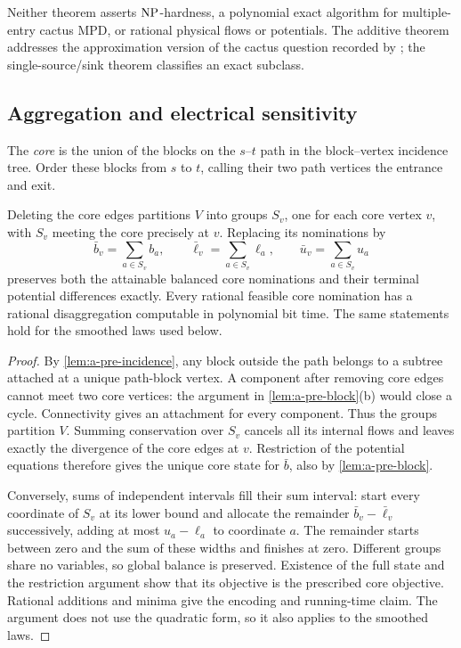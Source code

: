 Neither theorem asserts $\mathrm{NP}$-hardness, a polynomial exact algorithm for
multiple-entry cactus MPD, or rational physical flows or potentials.
The additive theorem
addresses the approximation version of the cactus question recorded by
\citet[pp.~9--10]{pfetsch2026-potential-based-flowsan-overview}; the
single-source/sink theorem classifies an exact subclass.

\subsection{Aggregation and electrical sensitivity}
\label{subsec:a-cac-structure}
The \emph{core} is the union of the blocks on the $s$--$t$ path in the
block--vertex incidence tree. Order these blocks from $s$ to $t$, calling
their two path vertices the entrance and exit.

\begin{lemma}
\label{lem:a-cac-aggregation}
Deleting the core edges partitions $V$ into groups $S_v$, one for each
core vertex $v$, with $S_v$ meeting the core precisely at $v$.
Replacing its nominations by
\[
 \bar b_v=\sum_{a\in S_v}b_a,\qquad
 \bar\ell_v=\sum_{a\in S_v}\ell_a,\qquad
 \bar u_v=\sum_{a\in S_v}u_a
\]
preserves both the attainable balanced core nominations and their
terminal potential differences exactly. Every rational feasible core
nomination has a rational disaggregation computable in polynomial bit
time. The same statements hold for the smoothed laws used below.
\end{lemma}
\begin{proof}
By \cref{lem:a-pre-incidence}, any block outside the path belongs to a
subtree attached at a unique path-block vertex. A component after
removing core edges cannot meet two core vertices: the argument in
\cref{lem:a-pre-block}(b) would close a cycle. Connectivity gives an
attachment for every component. Thus the groups partition $V$.
Summing conservation over $S_v$ cancels all its internal flows and
leaves exactly the divergence of the core edges at $v$. Restriction of
the potential equations therefore gives the unique core state for
$\bar b$, also by \cref{lem:a-pre-block}.

Conversely, sums of independent intervals fill their sum interval:
start every coordinate of $S_v$ at its lower bound and
allocate the remainder $\bar b_v-\bar\ell_v$ successively, adding at
most $u_a-\ell_a$ to coordinate $a$. The remainder starts between zero
and the sum of these widths and finishes at zero. Different groups
share no variables, so global balance is preserved. Existence of the
full state and the restriction argument show that its objective is the
prescribed core objective. Rational additions and minima give the
encoding and running-time claim. The argument does not use the
quadratic form, so it also applies to the smoothed laws.
\end{proof}

